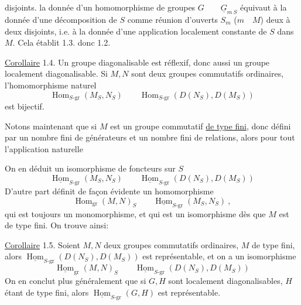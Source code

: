 disjoints.  la donnée d'un homomorphisme de groupes $G\qquad\underline G_{m\ S}$ équivaut à la donnée d'une décomposition de $S$ comme réunion d'ouverts $S_m$ ($m\quad M$) deux à deux disjoints, i.e. à la donnée d'une application localement constante de $S$ dans $M$. Cela établit 1.3. donc 1.2.

\uline{Corollaire} 1.4. Un groupe diagonalisable est réflexif, donc aussi un groupe localement diagonalisable. Si $M,N$ sont deux groupes commutatifs ordinaires,  l'homomorphisme naturel
\[
 \operatorname{Hom}_{S\text{-gr}}(M_S,N_S)\qquad\operatorname{Hom}_{S\text{-gr}}(D(N_S),D(M_S))
\]
est bijectif.

Notons maintenant que si $M$ est un groupe commutatif \uline{de type fini},  donc défini par un nombre fini de générateurs et un nombre fini de relations, alors pour tout   l'application naturelle

On en déduit un isomorphisme de foncteurs sur $S$\unsure{:|=}
\[
 \underline{\operatorname{Hom}}_{S\text{-gr}}(M_S,N_S)\qquad\underline{\operatorname{Hom}}_{S\text{-gr}}(D(N_S),D(M_S))
\]
D'autre part  définit de façon évidente un homomorphisme
\[
 \operatorname{Hom}_{\mathrm{gr}}(M,N)_S\qquad\underline{\operatorname{Hom}}_{S\text{-gr}}(M_S,N_S)\ ,
\]
qui est toujours  un monomorphisme, et qui est un isomorphisme dès que $M$ est de type fini. On trouve ainsi:

\uline{Corollaire} 1.5.  Soient $M,N$ deux groupes commutatifs ordinaires, $M$ de type fini, alors  $\underline{\operatorname{Hom}}_{S\text{-gr}}(D(N_S),D(M_S))$ est représentable, et on a un isomorphisme
\[
 \underline{\operatorname{Hom}}_{\mathrm{gr}}(M,N)_S\qquad\underline{\operatorname{Hom}}_{S\text{-gr}}(D(N_S),D(M_S))
\]
On en conclut plus généralement que si $G,H$ sont localement diagonalisables, $H$ étant de type fini, alors $\underline{\operatorname{Hom}}_{S\text{-gr}}(G,H)$ est représentable.
